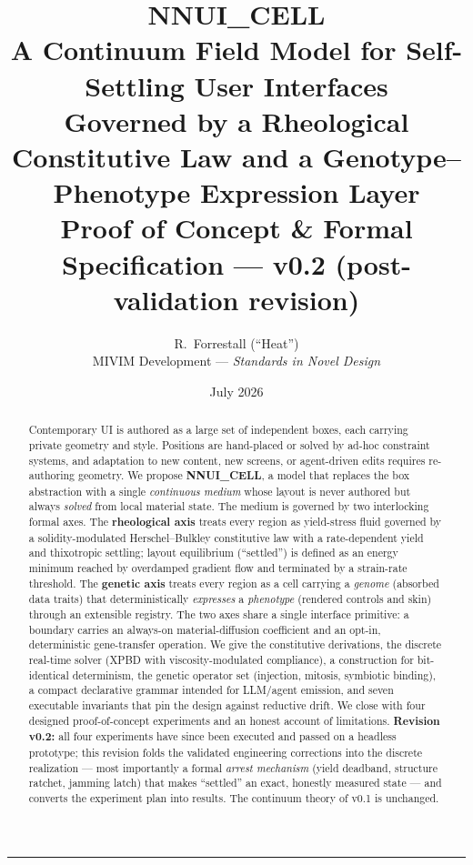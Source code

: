 \documentclass[11pt]{article}
\title{\vspace{-2em}\textbf{NNUI\_CELL}\\[0.3em]
\large A Continuum Field Model for Self-Settling User Interfaces\\
\large Governed by a Rheological Constitutive Law and a Genotype--Phenotype Expression Layer\\[0.6em]
\normalsize Proof of Concept \& Formal Specification --- v0.2 (post-validation revision)}
\author{R.~Forrestall (``Heat'')\\ \normalsize MIVIM Development --- \textit{Standards in Novel Design}}
\date{July 2026}
\begin{document}
\maketitle

\begin{abstract}
\noindent
Contemporary UI is authored as a large set of independent boxes, each carrying private
geometry and style. Positions are hand-placed or solved by ad-hoc constraint systems, and
adaptation to new content, new screens, or agent-driven edits requires re-authoring geometry.
We propose \textbf{NNUI\_CELL}, a model that replaces the box abstraction with a single
\emph{continuous medium} whose layout is never authored but always \emph{solved} from local
material state. The medium is governed by two interlocking formal axes. The
\textbf{rheological axis} treats every region as yield-stress fluid governed by a
solidity-modulated Herschel--Bulkley constitutive law with a rate-dependent yield and
thixotropic settling; layout equilibrium (``settled'') is defined as an energy minimum reached
by overdamped gradient flow and terminated by a strain-rate threshold. The \textbf{genetic
axis} treats every region as a cell carrying a \emph{genome} (absorbed data traits) that
deterministically \emph{expresses} a \emph{phenotype} (rendered controls and skin) through an
extensible registry. The two axes share a single interface primitive: a boundary carries an
always-on material-diffusion coefficient and an opt-in, deterministic gene-transfer operation.
We give the constitutive derivations, the discrete real-time solver (XPBD with
viscosity-modulated compliance), a construction for bit-identical determinism, the genetic
operator set (injection, mitosis, symbiotic binding), a compact declarative grammar intended
for LLM/agent emission, and seven executable invariants that pin the design against
reductive drift. We close with four designed proof-of-concept experiments and an honest
account of limitations. \textbf{Revision v0.2:} all four experiments have since been executed
and passed on a headless prototype; this revision folds the validated engineering corrections
into the discrete realization --- most importantly a formal \emph{arrest mechanism} (yield
deadband, structure ratchet, jamming latch) that makes ``settled'' an exact, honestly measured
state --- and converts the experiment plan into results. The continuum theory of v0.1 is
unchanged.
\end{abstract}

\noindent\textcolor{rule}{\rule{\linewidth}{0.8pt}}
\end{document}
